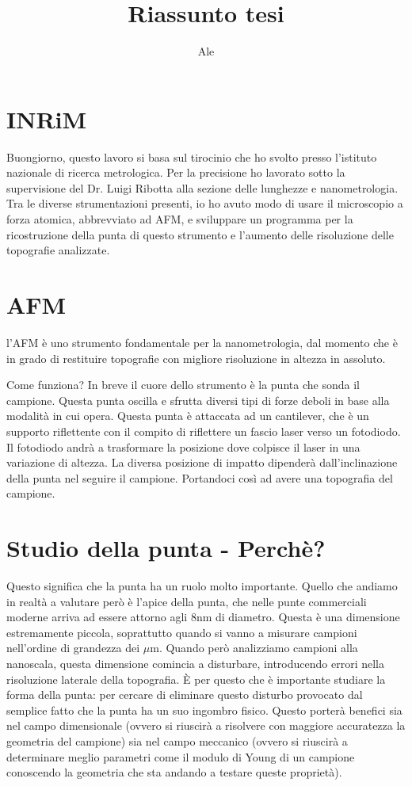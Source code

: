 \documentclass[12pt]{report}
\begin{document}
\title{Riassunto tesi}
\author{Ale}

\maketitle

\section{INRiM}

Buongiorno, questo lavoro si basa sul tirocinio che ho svolto presso l'istituto nazionale di ricerca metrologica. Per la precisione ho lavorato sotto la supervisione del Dr. Luigi Ribotta alla sezione delle lunghezze e nanometrologia. Tra le diverse strumentazioni presenti, io ho avuto modo di usare il microscopio a forza atomica, abbrevviato ad AFM, e sviluppare un programma per la ricostruzione della punta di questo strumento e l'aumento delle risoluzione delle topografie analizzate.

\section{AFM}

l'AFM è uno strumento fondamentale per la nanometrologia, dal momento che è in grado di restituire topografie con migliore risoluzione in altezza in assoluto. 

Come funziona? In breve il cuore dello strumento è la punta che sonda il campione. Questa punta oscilla e sfrutta diversi tipi di forze deboli in base alla modalità in cui opera. Questa punta è attaccata ad un cantilever, che è un supporto riflettente con il compito di riflettere un fascio laser verso un fotodiodo. Il fotodiodo andrà a trasformare la posizione dove colpisce il laser in una variazione di altezza. La diversa posizione di impatto dipenderà dall'inclinazione della punta nel seguire il campione. Portandoci così ad avere una topografia del campione.

\section{Studio della punta - Perchè?}

Questo significa che la punta ha un ruolo molto importante. Quello che andiamo in realtà a valutare però è l'apice della punta, che nelle punte commerciali moderne arriva ad essere attorno agli 8nm di diametro. Questa è una dimensione estremamente piccola, soprattutto quando si vanno a misurare campioni nell'ordine di grandezza dei $\mu$m. Quando però analizziamo campioni alla nanoscala, questa dimensione comincia a disturbare, introducendo errori nella risoluzione laterale della topografia. È per questo che è importante studiare la forma della punta: per cercare di eliminare questo disturbo provocato dal semplice fatto che la punta ha un suo ingombro fisico. Questo porterà benefici sia nel campo dimensionale (ovvero si riuscirà a risolvere con maggiore accuratezza la geometria del campione) sia nel campo meccanico (ovvero si riuscirà a determinare meglio parametri come il modulo di Young di un campione conoscendo la geometria che sta andando a testare queste proprietà).
\end{document}
